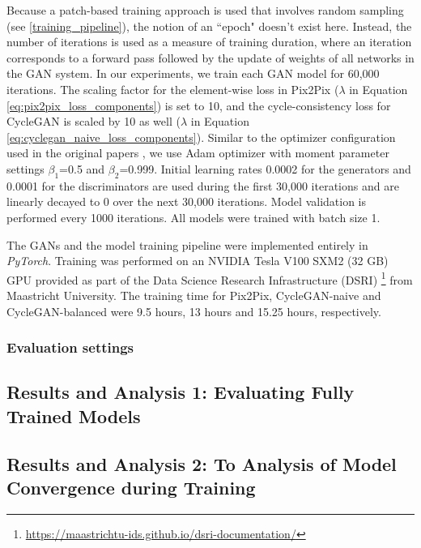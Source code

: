 Because a patch-based training approach is used that involves random sampling (see \ref{training_pipeline}), the notion of an ``epoch" doesn't exist here. Instead, the number of iterations is used as a measure of training duration, where an iteration corresponds to a forward pass followed by the update of weights of all networks in the GAN system. In our experiments, we train each GAN model for 60,000 iterations. 
The scaling factor for the element-wise loss in Pix2Pix ($\lambda$ in Equation \ref{eq:pix2pix_loss_components}) is set to 10, and the cycle-consistency loss for CycleGAN is scaled by 10 as well ($\lambda$ in Equation \ref{eq:cyclegan_naive_loss_components}). Similar to the optimizer configuration used in the original papers \cite{isola2017image, zhu2017unpaired}, we use Adam optimizer with moment parameter settings $\beta_1$=0.5 and $\beta_2$=0.999. Initial learning rates 0.0002 for the generators and 0.0001 for the discriminators are used during the first 30,000 iterations and are linearly decayed to 0 over the next 30,000 iterations. Model validation is performed every 1000 iterations. All models were trained with batch size 1.

The GANs and the model training pipeline were implemented entirely in \textit{PyTorch}. Training was performed on an NVIDIA Tesla V100 SXM2 (32 GB) GPU provided as part of the Data Science Research Infrastructure (DSRI) \footnote{\url{https://maastrichtu-ids.github.io/dsri-documentation/}} from Maastricht University. The training time for Pix2Pix, CycleGAN-naive and CycleGAN-balanced were 9.5 hours, 13 hours and 15.25 hours, respectively. 


\subsubsection{Evaluation settings}


\subsection{Results and Analysis 1: Evaluating Fully Trained Models}


\subsection{Results and Analysis 2: To Analysis of Model Convergence during Training}



